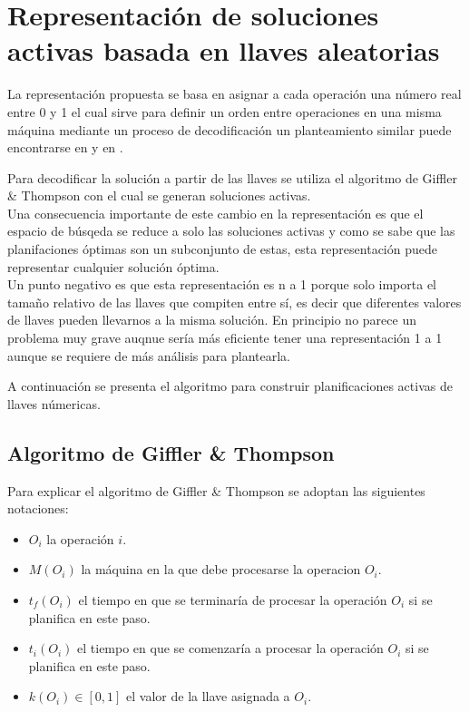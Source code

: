 \section{Representación de soluciones activas basada en llaves aleatorias}
La representación propuesta se basa en asignar a cada operación una número real entre 0 y 1 el cual sirve para definir un orden entre operaciones en una misma máquina mediante un proceso de decodificación un planteamiento similar puede encontrarse en \cite{norman1996random} y en \cite{Ponsich2013}.

Para decodificar la solución a partir de las llaves se utiliza el algoritmo de Giffler \& Thompson \cite{Giffler1960} con el cual se generan soluciones activas.\\ 

Una consecuencia importante de este cambio en la representación es que el espacio de búsqeda se reduce a solo las soluciones activas y como se sabe que las planifaciones óptimas son un subconjunto de estas, esta representación puede representar cualquier solución óptima. 
\\

Un punto negativo es que esta representación es n a 1 porque solo importa el tamaño relativo de las llaves que compiten entre sí, es decir que diferentes valores de llaves pueden llevarnos a la misma solución. En principio no parece un problema muy grave auqnue sería más eficiente tener una representación 1 a 1 aunque se requiere de más análisis para plantearla.

A continuación se presenta el algoritmo para construir planificaciones activas de llaves númericas.

\subsection*{Algoritmo de Giffler \& Thompson}
Para explicar el algoritmo de Giffler \& Thompson se adoptan las siguientes notaciones:
\begin{itemize}
    \item $O_i$ la operación $i$.
    \item $M(O_i)$ la máquina en la que debe procesarse la operacion $O_i$.
    \item $t_f(O_i)$ el tiempo en que se terminaría de procesar la operación $O_i$ si se planifica en este paso.
    \item $t_i(O_i)$ el tiempo en que se comenzaría a procesar la operación $O_i$ si se planifica en este paso.
    \item $k(O_i)\in [0,1]$ el valor de la llave asignada a $O_i$.
\end{itemize}

